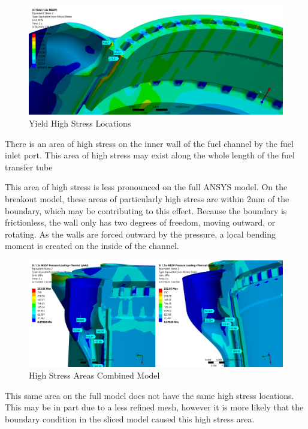 \begin{figure}
    \centering
    \includegraphics[width=1\linewidth]{Images/Yield High Stress Locations.png}
    \caption{Yield High Stress Locations}
    \label{fig:Yield High Stress Locations}
\end{figure}
There is an area of high stress on the inner wall of the fuel channel by the fuel inlet port. This area of high stress may exist along the whole length of the fuel transfer tube 

This area of high stress is less pronounced on the full ANSYS model. On the breakout model, these areas of particularly high stress are within 2mm of the boundary, which may be contributing to this effect. Because the boundary is frictionless, the wall only has two degrees of freedom, moving outward, or rotating. As the walls are forced outward by the pressure, a local bending moment is created on the inside of the channel.
\begin{figure}
    \centering
    \includegraphics[width=1\linewidth]{Images/High Stress Areas Combined Model.png}
    \caption{High Stress Areas Combined Model}
    \label{fig:High Stress Areas Combined Model}
\end{figure}
This same area on the full model does not have the same high stress locations. This may be in part due to a less refined mesh, however it is more likely that the boundary condition in the sliced model caused this high stress area. 

